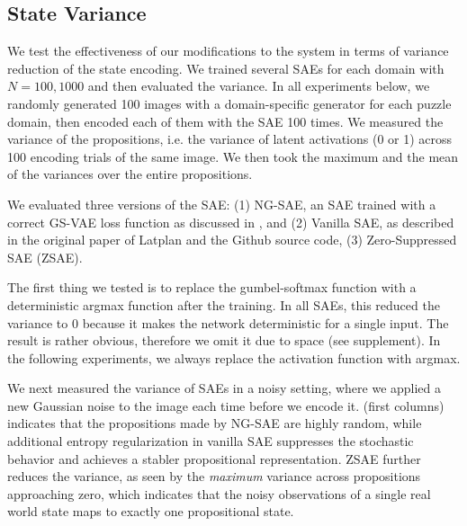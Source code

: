 \subsection{State Variance}

We test the effectiveness of our modifications to the system in terms of variance reduction of the state encoding.
We trained several SAEs for each domain with $N=100,1000$ and then evaluated the variance.
In all experiments below,
we randomly generated 100 images with a domain-specific generator for each puzzle domain,
then encoded each of them with the SAE 100 times.
We measured the variance of the propositions, i.e. the variance of latent activations (0 or 1)
across 100 encoding trials of the same image.
We then took the maximum and the mean of the variances over the entire propositions.

We evaluated three versions of the SAE:
(1) NG-SAE, an SAE trained with a correct GS-VAE loss function as discussed in , and
(2) Vanilla SAE, as described in the original paper of Latplan \cite{Asai2018} and the Github source code,
(3) Zero-Suppressed SAE (ZSAE).

The first thing we tested is to replace the gumbel-softmax function with a deterministic argmax function
after the training.
In all SAEs,
this reduced the variance to 0 because it makes the network deterministic for a single input.
The result is rather obvious, therefore we omit it due to space (see supplement).
In the following experiments, we always replace the activation function with argmax.

We next measured the variance of SAEs in a noisy setting, where
we applied a new Gaussian noise to the image each time before we encode it.
 (first columns) indicates that
the propositions made by NG-SAE are highly random,
while additional entropy regularization in vanilla SAE suppresses the stochastic behavior
and achieves a stabler propositional representation.
ZSAE further reduces the variance, as seen by the \emph{maximum} variance across propositions approaching zero,
which indicates that the noisy observations of a single real world state maps to exactly one propositional state.

